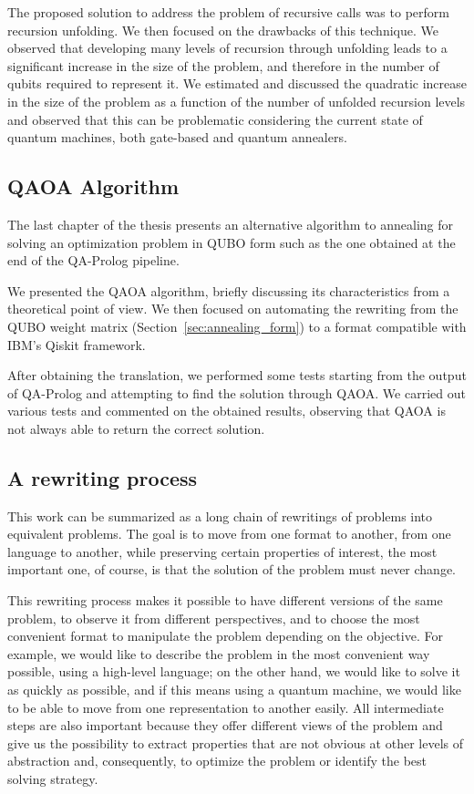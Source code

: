 The proposed solution to address the problem of recursive calls was to perform recursion unfolding. We then focused on the drawbacks of this technique. We observed that developing many levels of recursion through unfolding leads to a significant increase in the size of the problem, and therefore in the number of qubits required to represent it. We estimated and discussed the quadratic increase in the size of the problem as a function of the number of unfolded recursion levels and observed that this can be problematic considering the current state of quantum machines, both gate-based and quantum annealers.

\subsection{QAOA Algorithm}
The last chapter of the thesis presents an alternative algorithm to annealing for solving an optimization problem in QUBO form such as the one obtained at the end of the QA-Prolog pipeline.

We presented the QAOA algorithm, briefly discussing its characteristics from a theoretical point of view. We then focused on automating the rewriting from the QUBO weight matrix (Section~\ref{sec:annealing_form}) to a format compatible with IBM's Qiskit framework.

After obtaining the translation, we performed some tests starting from the output of QA-Prolog and attempting to find the solution through QAOA. We carried out various tests and commented on the obtained results, observing that QAOA is not always able to return the correct solution.

\subsection{A rewriting process}
This work can be summarized as a long chain of rewritings of problems into equivalent problems. The goal is to move from one format to another, from one language to another, while preserving certain properties of interest, the most important one, of course, is that the solution of the problem must never change.

This rewriting process makes it possible to have different versions of the same problem, to observe it from different perspectives, and to choose the most convenient format to manipulate the problem depending on the objective. For example, we would like to describe the problem in the most convenient way possible, using a high-level language; on the other hand, we would like to solve it as quickly as possible, and if this means using a quantum machine, we would like to be able to move from one representation to another easily. All intermediate steps are also important because they offer different views of the problem and give us the possibility to extract properties that are not obvious at other levels of abstraction and, consequently, to optimize the problem or identify the best solving strategy.


